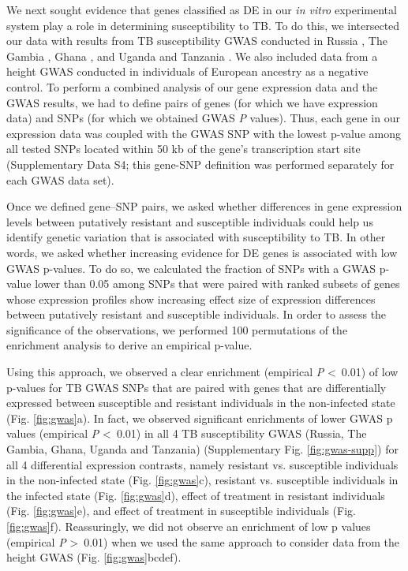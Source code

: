 \documentclass[fleqn,10pt]{wlscirep}
\begin{document}
We next sought evidence that genes classified as DE in our \emph{in
vitro} experimental system play a role in determining susceptibility
to TB. To do this, we intersected our data with results from TB
susceptibility GWAS conducted in Russia \cite{Curtis2015}, The Gambia
\cite{Thye2010}, Ghana \cite{Thye2010}, and Uganda and Tanzania
\cite{Sobota2016}. We also included data from a height GWAS conducted
in individuals of European ancestry \cite{LangoAllen2010} as a
negative control. To perform a combined analysis of our gene
expression data and the GWAS results, we had to define pairs of genes
(for which we have expression data) and SNPs (for which we obtained
GWAS \emph{P} values). Thus, each gene in our expression data was
coupled with the GWAS SNP with the lowest p-value among all tested
SNPs located within 50 kb of the gene’s transcription start site
(Supplementary Data S4; this gene-SNP definition was performed
separately for each GWAS data set).

Once we defined gene–SNP pairs, we asked whether differences in gene
expression levels between putatively resistant and susceptible
individuals could help us identify genetic variation that is
associated with susceptibility to TB. In other words, we asked whether
increasing evidence for DE genes is associated with low GWAS p-values.
To do so, we calculated the fraction of SNPs with a GWAS p-value lower
than 0.05 among SNPs that were paired with ranked subsets of genes
whose expression profiles show increasing effect size of expression
differences between putatively resistant and susceptible individuals.
In order to assess the significance of the observations, we performed
100 permutations of the enrichment analysis to derive an empirical
p-value.

Using this approach, we observed a clear enrichment (empirical
\emph{P} \textless \, 0.01) of low p-values for TB GWAS SNPs that are
paired with genes that are differentially expressed between
susceptible and resistant individuals in the non-infected state (Fig.
\ref{fig:gwas}a). In fact, we observed significant enrichments of
lower GWAS p values (empirical \emph{P} \textless \, 0.01) in all 4 TB
susceptibility GWAS (Russia, The Gambia, Ghana, Uganda and Tanzania)
(Supplementary Fig. \ref{fig:gwas-supp}) for all 4 differential
expression contrasts, namely resistant vs. susceptible individuals in
the non-infected state (Fig. \ref{fig:gwas}c), resistant vs.
susceptible individuals in the infected state (Fig. \ref{fig:gwas}d),
effect of treatment in resistant individuals (Fig. \ref{fig:gwas}e),
and effect of treatment in susceptible individuals (Fig.
\ref{fig:gwas}f). Reassuringly, we did not observe an enrichment of
low p values (empirical \emph{P} \textgreater \, 0.01) when we used
the same approach to consider data from the height GWAS (Fig.
\ref{fig:gwas}bcdef).
\end{document}
